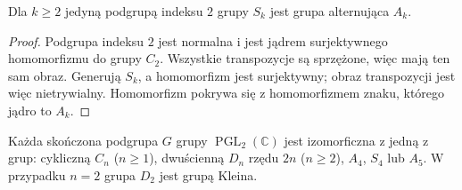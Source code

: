 \begin{lemat}
\label{aa:lem:pgl2-index2}
Dla $k\ge2$ jedyną podgrupą indeksu $2$ grupy $S_k$
jest grupa alternująca $A_k$.
\end{lemat}
\begin{proof}
Podgrupa indeksu $2$ jest normalna i jest jądrem
surjektywnego homomorfizmu do grupy $C_2$.
Wszystkie transpozycje są sprzężone, więc mają ten sam
obraz. Generują $S_k$, a homomorfizm jest surjektywny;
obraz transpozycji jest więc nietrywialny. Homomorfizm
pokrywa się z homomorfizmem znaku, którego jądro to $A_k$.
\end{proof}

\begin{twierdzenie}
\label{aa:tw:pgl2-classification}
Każda skończona podgrupa $G$ grupy
$\operatorname{PGL}_2(\mathbb C)$ jest izomorficzna
z jedną z grup: cykliczną $C_n$ ($n\ge1$),
dwuścienną $D_n$ rzędu $2n$ ($n\ge2$),
$A_4$, $S_4$ lub $A_5$.
W przypadku $n=2$ grupa $D_2$ jest grupą Kleina.
\end{twierdzenie}

